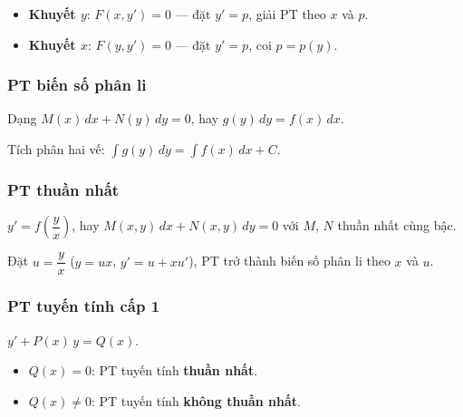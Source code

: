 \documentclass[12pt,a4paper]{article}
\begin{document}
\begin{congthuc}
  \begin{itemize}
    \item \textbf{Khuyết $y$}: $F(x, y') = 0$ --- đặt $y' = p$, giải PT theo $x$ và $p$.
    \item \textbf{Khuyết $x$}: $F(y, y') = 0$ --- đặt $y' = p$, coi $p = p(y)$.
  \end{itemize}
\end{congthuc}

\subsubsection{PT biến số phân li}

\begin{dinhnghia}
  Dạng $M(x)\,dx + N(y)\,dy = 0$, hay $g(y)\,dy = f(x)\,dx$.
\end{dinhnghia}

\begin{phuongphap}
  Tích phân hai vế: $\displaystyle\int g(y)\,dy = \int f(x)\,dx + C$.
\end{phuongphap}

\subsubsection{PT thuần nhất}

\begin{dinhnghia}
  $y' = f\!\left(\dfrac{y}{x}\right)$, hay $M(x,y)\,dx + N(x,y)\,dy = 0$ với $M$, $N$ thuần nhất cùng bậc.
\end{dinhnghia}

\begin{phuongphap}
  Đặt $u = \dfrac{y}{x}$ ($y = ux$, $y' = u + xu'$), PT trở thành biến số phân li theo $x$ và $u$.
\end{phuongphap}

\subsubsection{PT tuyến tính cấp 1}

\begin{dinhnghia}
  $y' + P(x)\,y = Q(x)$.
  \begin{itemize}
    \item $Q(x) = 0$: PT tuyến tính \textbf{thuần nhất}.
    \item $Q(x) \ne 0$: PT tuyến tính \textbf{không thuần nhất}.
  \end{itemize}
\end{dinhnghia}
\end{document}
